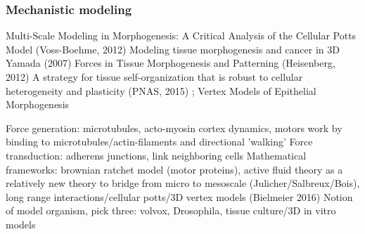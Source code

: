 \documentclass[fleqn,10pt]{wlscirep}
\begin{document}



\subsubsection*{Mechanistic modeling}
Multi-Scale Modeling in Morphogenesis: A Critical Analysis of the Cellular Potts Model (Voss-Boehme, 2012) \cite{voss2012multi}
Modeling tissue morphogenesis and cancer in 3D Yamada (2007) \cite{yamada2007modeling}
Forces in Tissue Morphogenesis and Patterning (Heisenberg, 2012) \cite{heisenberg2013forces}
A strategy for tissue self-organization that is robust to
cellular heterogeneity and plasticity (PNAS, 2015) \cite{cerchiari2015strategy} ;
Vertex Models of Epithelial Morphogenesis~\cite{fletcher2014vertex}

Force generation: microtubules, acto-myosin cortex dynamics, motors work by binding to microtubules/actin-filaments and directional 'walking'
Force transduction: adherens junctions, link neighboring cells
Mathematical frameworks: brownian ratchet model (motor proteins), active fluid theory as a relatively new theory to bridge from micro to mesoscale (Julicher/Salbreux/Bois), long range interactions/cellular potts/3D vertex models (Bielmeier 2016)
Notion of model organism, pick three: volvox, Drosophila, tissue culture/3D in vitro models 
\end{document}
